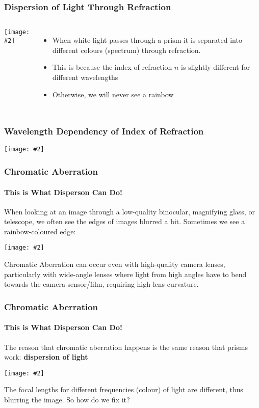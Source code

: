 \documentclass[compress,aspectratio=169]{beamer}
\newcommand{\pic}[2]{\texttt{[image: \#2]}}
\begin{document}
\begin{frame}
  \frametitle{Dispersion of Light Through Refraction}
  \begin{columns}
    \pic{1}{white-light-split.jpg}
    \begin{itemize}
    \item When white light passes through a prism it is separated into
      different colours (spectrum) through refraction.
    \item This is because the index of refraction $n$ is slightly different for
      different wavelengths
    \item Otherwise, we will never see a rainbow
    \end{itemize}
  \end{columns}
\end{frame}

\begin{frame}
  \frametitle{Wavelength Dependency of Index of Refraction}
  \begin{center}
    \pic{.5}{Dispersion-curve.png}
  \end{center}
\end{frame}

\begin{frame}
  \frametitle{Chromatic Aberration}
  \framesubtitle{This is What Disperson Can Do!}
  When looking at an image through a low-quality binocular, magnifying glass, or
  telescope, we often see the edges of images blurred a bit. Sometimes we see
  a rainbow-coloured edge:
  \begin{center}
    \pic{.5}{choosing03-pic002.png}
  \end{center}
  Chromatic Aberration can occur even with high-quality camera lenses,
  particularly with wide-angle lenses where light from high angles have to bend
  towards the camera sensor/film, requiring high lens curvature.
\end{frame}

\begin{frame}
  \frametitle{Chromatic Aberration}
  \framesubtitle{This is What Disperson Can Do!}
  The reason that chromatic aberration happens is the same reason that prisms
  work: \textbf{dispersion of light}
  \begin{center}
    \pic{.5}{chromatic-aberration.jpg}
  \end{center}
  The focal lengths for different frequencies (colour) of light are different,
  thus blurring the image. So how do we fix it?
\end{frame}
\end{document}
